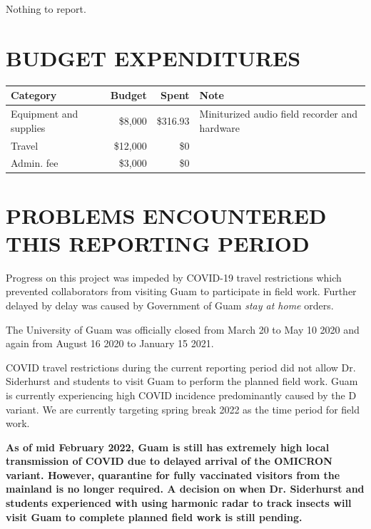 \documentclass[12pt,letterpaper,english,bibliography=totocnumbered,abstract=on]{scrartcl}
\begin{document}
Nothing to report.

\section{BUDGET EXPENDITURES}


\begin{tabular}{lrrl}
	\hline
	Category & Budget & Spent & Note \\
	\hline 
	Equipment and supplies & \$8,000 & \$316.93 & Miniturized audio field recorder and hardware \\ 
	Travel & \$12,000 & \$0 \\ 
	Admin. fee & \$3,000 & \$0 \\ 
	\hline 
\end{tabular} 

\section{PROBLEMS ENCOUNTERED THIS REPORTING PERIOD}
\label{impediments}


Progress on this project was impeded by COVID-19 travel restrictions which prevented collaborators from visiting Guam to participate in field work. Further delayed by delay was caused by Government of Guam \textit{stay at home} orders. 

The University of Guam was officially closed from March 20 to May 10 2020 and again from August 16 2020 to January 15 2021.

COVID travel restrictions during the current reporting period did not allow Dr. Siderhurst and students to visit Guam to perform the planned field work. Guam is currently experiencing high COVID incidence predominantly caused by the D variant. We are currently targeting spring break 2022 as the time period for field work.

\textbf{As of mid February 2022, Guam is still has extremely high local transmission of COVID due to delayed arrival of the OMICRON variant. However, quarantine for fully vaccinated visitors from the mainland is no longer required. A decision on when Dr. Siderhurst and students experienced with using harmonic radar to track insects will visit Guam to complete planned field work is still pending.}  
\end{document}
